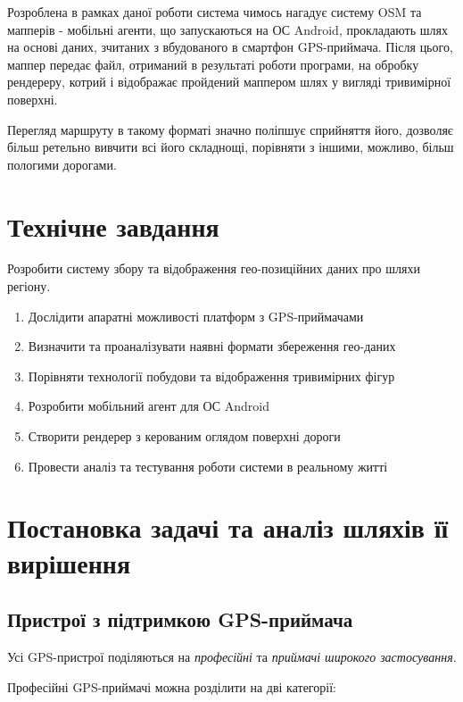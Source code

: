 \documentclass[simple,a4paper,14pt,ukrainian,utf8]{eskdtext}
\begin{document}
    Розроблена в рамках даної роботи система чимось нагадує систему OSM та мапперів - мобільні агенти, що запускаються на ОС Android, прокладають шлях на основі даних, зчитаних з вбудованого в смартфон GPS-приймача. Після цього, маппер передає файл, отриманий в результаті роботи програми, на обробку рендереру, котрий і відображає пройдений маппером шлях у вигляді тривимірної поверхні.
    
    Перегляд маршруту в такому форматі значно поліпшує сприйняття його, дозволяє більш ретельно вивчити всі його складнощі, порівняти з іншими, можливо, більш пологими дорогами.

\newpage \section{Технічне завдання}

    Розробити систему збору та відображення гео-позиційних даних про шляхи регіону.

    \begin{enumerate}
        \item Дослідити апаратні можливості платформ з GPS-приймачами
        \item Визначити та проаналізувати наявні формати збереження гео-даних
        \item Порівняти технології побудови та відображення тривимірних фігур
        \item Розробити мобільний агент для ОС Android
        \item Створити рендерер з керованим оглядом поверхні дороги
        \item Провести аналіз та тестування роботи системи в реальному житті
    \end{enumerate}

\newpage \section{Постановка задачі та аналіз шляхів її вирішення}

    \subsection{Пристрої з підтримкою GPS-приймача}
    
    Усі GPS-пристрої поділяються на \textit{професійні} та \textit{приймачі широкого застосування}.
	
	Професійні GPS-приймачі можна розділити на дві категорії:
    
\end{document}
